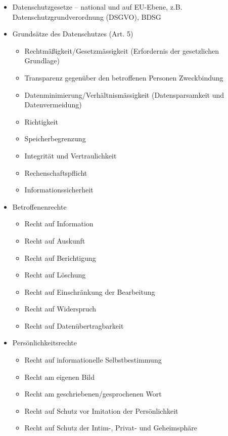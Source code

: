\begin{itemize}
	\item Datenschutzgesetze – national und auf EU-Ebene, z.B. Datenschutzgrundverordnung (DSGVO), BDSG
	\item Grundsätze des Datenschutzes (Art. 5)
	\begin{itemize}
		\item Rechtmäßigkeit/Gesetzmässigkeit (Erfordernis der gesetzlichen Grundlage)
		\item Transparenz gegenüber den betroffenen Personen
		Zweckbindung
		\item Datenminimierung/Verhältnismässigkeit (Datensparsamkeit und Datenvermeidung)
		\item Richtigkeit
		\item Speicherbegrenzung
		\item Integrität und Vertraulichkeit
		\item Rechenschaftspflicht
		\item Informationssicherheit
	\end{itemize}
	\item Betroffenenrechte
	\begin{itemize}
		\item Recht auf Information
		\item Recht auf Auskunft
		\item Recht auf Berichtigung
		\item Recht auf Löschung
		\item Recht auf Einschränkung der Bearbeitung
		\item Recht auf Widerspruch
		\item Recht auf Datenübertragbarkeit
	\end{itemize}
	\item Persönlichkeitsrechte
	\begin{itemize}
		\item Recht auf informationelle Selbstbestimmung
		\item Recht am eigenen Bild
		\item Recht am geschriebenen/gesprochenen Wort
		\item Recht auf Schutz vor Imitation der Persönlichkeit
		\item Recht auf Schutz der Intim-, Privat- und Geheimsphäre
	\end{itemize}
\end{itemize}